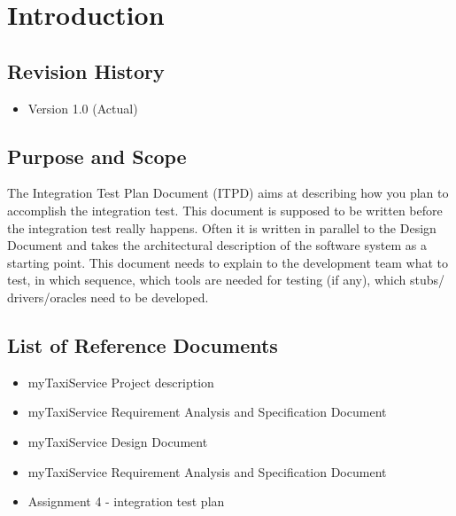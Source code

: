 \section{Introduction}
	\subsection{Revision History}
	\begin{itemize}
		\item Version 1.0 (Actual)
	\end{itemize}
	\subsection{Purpose and Scope}
	The Integration Test Plan Document (ITPD) aims at describing how you plan to accomplish the integration test.
	This document is supposed to be written before the integration test really happens.
	Often it is written in parallel to the Design Document and takes the architectural description of
	the software system as a starting point. This document needs to explain to the development team what
	to test, in which sequence, which tools are needed for testing (if any), which stubs/ drivers/oracles
	need to be developed.
	\subsection{List of Reference Documents}
	\begin{itemize}
		\item myTaxiService Project description
		\item myTaxiService Requirement Analysis and Specification Document
		\item myTaxiService Design Document
		\item myTaxiService Requirement Analysis and Specification Document
		\item Assignment 4 - integration test plan
	\end{itemize}
